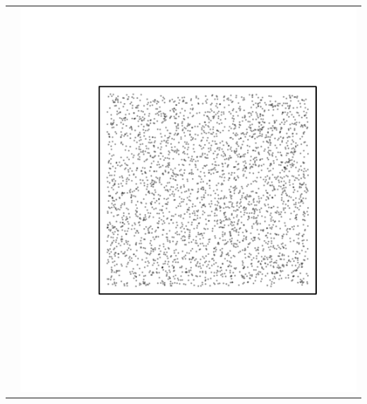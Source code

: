 \documentclass{article}\usepackage{graphicx, color}
\makeatletter
\def\maxwidth{ %
  \ifdim\Gin@nat@width>\linewidth
    \linewidth
  \else
    \Gin@nat@width
  \fi
}
\newenvironment{knitrout}{}{} %
\makeatother
\begin{document}
\begin{tabular}{cc}
&
\begin{knitrout}
\definecolor{shadecolor}{rgb}{0.969, 0.969, 0.969}\color{fgcolor}\includegraphics[width=\maxwidth]{figure/unnamed-chunk-38} 
\end{knitrout}

\\
\end{tabular}
\end{document}
